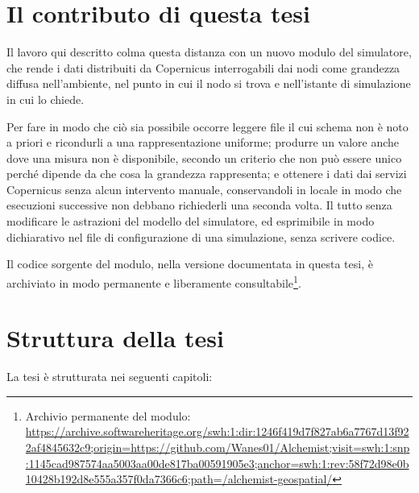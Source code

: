 \section{Il contributo di questa tesi}
\label{sec:contributo}

Il lavoro qui descritto colma questa distanza con un nuovo modulo del
simulatore, che rende i dati distribuiti da Copernicus interrogabili dai
nodi come grandezza diffusa nell'ambiente, nel punto in cui il nodo
si trova e nell'istante di simulazione in cui lo chiede.

Per fare in modo che ciò sia possibile occorre leggere file il cui schema non
è noto a priori e ricondurli a una rappresentazione uniforme; produrre un valore
anche dove una misura non è disponibile, secondo un criterio che non può essere
unico perché dipende da che cosa la grandezza rappresenta; e ottenere i dati
dai servizi Copernicus senza alcun intervento manuale, conservandoli in locale
in modo che esecuzioni successive non debbano richiederli una seconda volta.
Il tutto senza modificare le astrazioni del modello del simulatore, ed esprimibile
in modo dichiarativo nel file di configurazione di una simulazione,
senza scrivere codice.

Il codice sorgente del modulo, nella versione documentata in questa tesi, è
archiviato in modo permanente e liberamente
consultabile\footnote{Archivio permanente del modulo: \url{https://archive.softwareheritage.org/swh:1:dir:1246f419d7f827ab6a7767d13f922af4845632c9;origin=https://github.com/Wanes01/Alchemist;visit=swh:1:snp:1145cad987574aa5003aa00de817ba00591905e3;anchor=swh:1:rev:58f72d98e0b10428b192d8e555a357f0da7366c6;path=/alchemist-geospatial/}}.

\section{Struttura della tesi}
\label{sec:struttura-della-tesi}

La tesi è strutturata nei seguenti capitoli:

